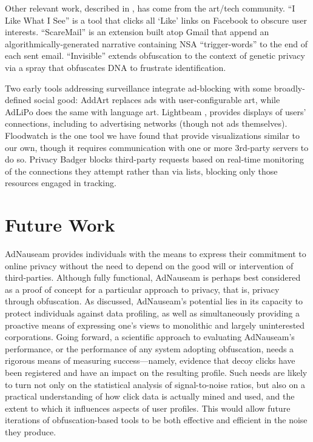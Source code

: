 \documentclass[conference]{IEEEtran}
\begin{document}
Other relevant work, described in \cite{Howe-3}, has come from the art/tech community. “I Like What I See” is a tool  that clicks all ‘Like’ links on Facebook to obscure user interests. “ScareMail” \cite{Grosser} is an extension built atop Gmail that append an algorithmically-generated narrative containing NSA “trigger-words” to the end of each sent email. “Invisible” \cite{Hagborg} extends obfuscation to the context of genetic privacy via a spray that obfuscates DNA to frustrate identification.

Two early tools addressing surveillance integrate ad-blocking with some broadly-defined social good: AddArt \cite{AddArt} replaces ads with user-configurable art, while AdLiPo \cite{Howe-0} does the same with language art. Lightbeam \cite{Mozilla}, provides displays of users' connections, including to advertising networks (though not ads themselves). Floodwatch \cite{Floodwatch} is the one tool we have found that provide visualizations similar to our own, though it requires communication with one or more 3rd-party servers to do so. Privacy Badger \cite{EFF-0} blocks third-party requests based on real-time monitoring of the connections they attempt rather than via lists, blocking only those resources engaged in tracking.

\section{Future Work}

AdNauseam provides individuals with the means to express their commitment to online privacy without the need to depend on the good will or intervention of third-parties. Although fully functional, AdNauseam is perhaps best considered as a proof of concept for a particular approach to privacy, that is, privacy through obfuscation. As discussed, AdNauseam's potential lies in its capacity to protect individuals against data profiling, as well as simultaneously providing a proactive means of expressing one's views to monolithic and largely uninterested corporations. Going forward, a scientific approach to evaluating AdNauseam's performance, or the performance of any system adopting obfuscation, needs a rigorous means of measuring success---namely, evidence that decoy clicks have been registered and have an impact on the resulting profile. Such needs are likely to turn not only on the statistical analysis of signal-to-noise ratios, but also on a practical understanding of how click data is actually mined and used, and the extent to which it influences aspects of user profiles. This would allow future iterations of obfuscation-based tools to be both effective and efficient in the noise they produce.
\end{document}
